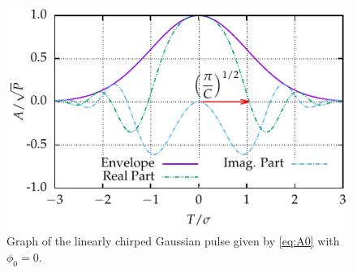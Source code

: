 \documentclass[9pt,twocolumn,twoside]{osajnl}
\begin{document}
\begin{figure}[tbp]
	\centering
	\includegraphics{Figures/Sample_Gauss}
	\caption{Graph of the linearly chirped Gaussian pulse given by \eqref{eq:A0} with $\phi_0 = 0$.}
	\label{fig:samplegauss}
\end{figure}
\end{document}
